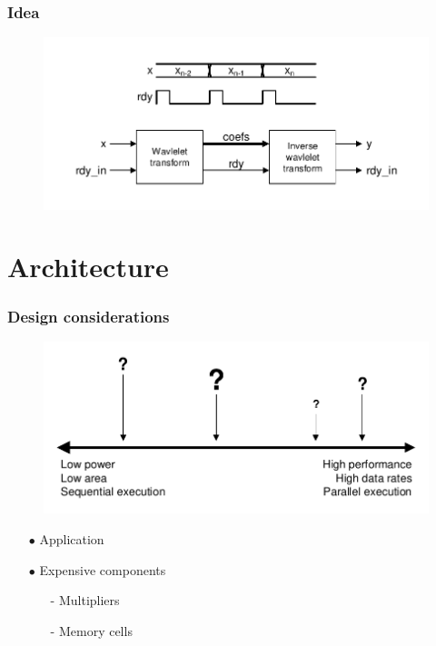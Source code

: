 \documentclass[english, aspectratio=169]{beamer}
\begin{document}
\begin{frame}
\frametitle{Idea}

\begin{figure}
	\includegraphics[scale=0.7]{idea.pdf}
\end{figure}
\end{frame}


\section{Architecture}
\begin{frame}
\frametitle{Design considerations}

\begin{figure}
	\includegraphics[scale=0.7]{design_considerations.pdf}
\end{figure}

\begin{itemize}
	
	\item[$\bullet$] Application

	\item[$\bullet$] Expensive components
	\begin{itemize}
		\item[-] Multipliers
		\item[-] Memory cells
	\end{itemize}
	
\end{itemize}
\end{frame}
\end{document}
